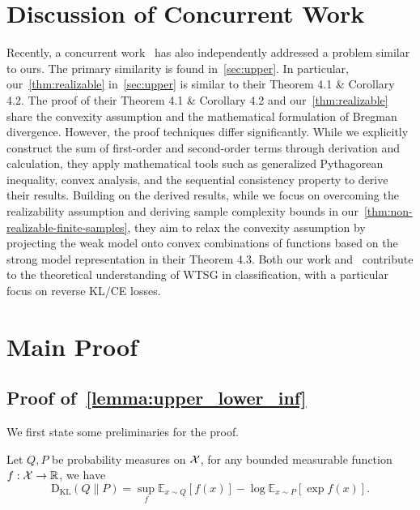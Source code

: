 \section{Discussion of Concurrent Work} \label{discussion:concurrent}


Recently, a concurrent work~\citep{mulgund2025relating} has also independently addressed a problem similar to ours. 
The primary similarity is found in~\cref{sec:upper}.
In particular, our~\cref{thm:realizable} in~\cref{sec:upper} is similar to their Theorem 4.1 \& Corollary 4.2.
The proof of their Theorem 4.1 \& Corollary 4.2 and our~\cref{thm:realizable} share the convexity assumption and the mathematical formulation of Bregman divergence. However, the proof techniques differ significantly. While we explicitly construct the sum of first-order and second-order terms through derivation and calculation, they apply mathematical tools such as generalized Pythagorean inequality, convex analysis, and the sequential consistency property to derive their results.
Building on the derived results, while we focus on overcoming the realizability assumption and deriving sample complexity bounds in our~\cref{thm:non-realizable-finite-samples}, they aim to relax the convexity assumption by projecting the weak model onto convex combinations of functions based on the strong model representation in their Theorem 4.3.
Both our work and~\citet{mulgund2025relating} contribute to the theoretical understanding of WTSG in classification, with a particular focus on reverse KL/CE losses.
 





\section{Main Proof} 

\subsection{Proof of~\cref{lemma:upper_lower_inf}} \label{proof_lemma_inf}

We first state some preliminaries for the proof.

\begin{lemma} \label{lemma:donsker}
Let $Q, P$ be probability measures on $\mathcal{X}$, for any bounded measurable function $f: \mathcal{X} \rightarrow \mathbb{R}$, we have $$\mathrm{D}_{\mathrm{KL}}(Q \| P)=\sup _f \mathbb{E}_{x \sim Q}[f(x)]-\log \mathbb{E}_{x \sim P}[\exp f(x)].$$
\end{lemma}


